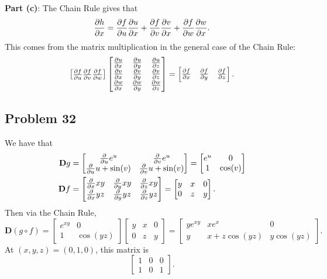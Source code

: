 \documentclass[11pt]{article}
\newcommand{\mat}[1]{\mathbf{#1}}
\begin{document}
\textbf{Part (c)}: The Chain Rule gives that
\[
	\pdv{h}{x} = \pdv{f}{u} \pdv{u}{x} + \pdv{f}{v} \pdv{v}{x} + \pdv{f}{w} \pdv{w}{x}.
\]
This comes from the matrix multiplication in the general case of the Chain Rule:
\[
	\begin{bmatrix} \pdv{f}{u} \pdv{f}{v} \pdv{f}{w} \end{bmatrix} \begin{bmatrix} \pdv{u}{x} & \pdv{u}{y} & \pdv{u}{z} \\ \pdv{v}{x} & \pdv{v}{y} & \pdv{v}{z} \\ \pdv{w}{x} & \pdv{w}{y} & \pdv{w}{z} \end{bmatrix} = \begin{bmatrix} \pdv{f}{x} & \pdv{f}{y} & \pdv{f}{z} \end{bmatrix}.
\]


\subsection{Problem 32}

We have that
\begin{align*}
	\mat{D}g &= \begin{bmatrix} \pdv{u} e^{u} & \pdv{v} e^{u} \\ \pdv{u} u + \sin(v) & \pdv{v} u + \sin(v) \end{bmatrix} = \begin{bmatrix} e^{u} & 0 \\ 1 & \cos(v) \end{bmatrix} \\
	\mat{D}f &= \begin{bmatrix} \pdv{x} xy & \pdv{y} xy & \pdv{z} xy \\ \pdv{x} yz & \pdv{y} yz & \pdv{z} yz \end{bmatrix} = \begin{bmatrix} y & x & 0 \\ 0 & z & y \end{bmatrix}.
\end{align*}
Then via the Chain Rule,
\[
	\mat{D}(g \circ f) = \begin{bmatrix} e^{xy} & 0 \\ 1 & \cos(yz) \end{bmatrix} \begin{bmatrix} y & x & 0 \\ 0 & z & y \end{bmatrix} = \begin{bmatrix} y e^{xy} & x e^{x} & 0 \\ y & x + z \cos(yz) & y \cos(yz) \end{bmatrix}.
\]
At $(x, y, z) = (0, 1, 0)$, this matrix is 
\[
	\begin{bmatrix} 1 & 0 & 0 \\ 1 & 0 & 1 \end{bmatrix}.
\]
\end{document}
